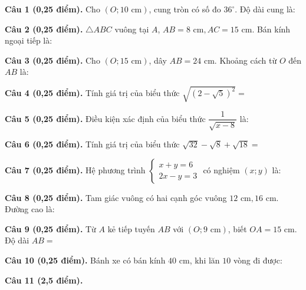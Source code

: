 \documentclass[12pt,a4paper]{article}
\begin{document}
\vspace{1.2mm}
\noindent\textbf{Câu 1 (0,25 điểm).} Cho $(O; 10\text{ cm})$, cung tròn có số đo $36^\circ$. Độ dài cung là: \par\vspace{0.8mm}
\noindent\textbf{Câu 2 (0,25 điểm).} $\triangle ABC$ vuông tại $A$, $AB = 8\text{ cm}, AC = 15\text{ cm}$. Bán kính ngoại tiếp là: \par\vspace{0.8mm}
\noindent\textbf{Câu 3 (0,25 điểm).} Cho $(O; 15\text{ cm})$, dây $AB = 24\text{ cm}$. Khoảng cách từ $O$ đến $AB$ là: \par\vspace{0.8mm}
\noindent\textbf{Câu 4 (0,25 điểm).} Tính giá trị của biểu thức $\sqrt{(2 - \sqrt{5})^2} = $ \par\vspace{0.8mm}
\noindent\textbf{Câu 5 (0,25 điểm).} Điều kiện xác định của biểu thức $\dfrac{1}{\sqrt{x - 8}}$ là: \par\vspace{0.8mm}
\noindent\textbf{Câu 6 (0,25 điểm).} Tính giá trị của biểu thức $\sqrt{32} - \sqrt{8} + \sqrt{18} = $ \par\vspace{0.8mm}
\noindent\textbf{Câu 7 (0,25 điểm).} Hệ phương trình $\begin{cases} x + y = 6 \\ 2x - y = 3 \end{cases}$ có nghiệm $(x; y)$ là: \par\vspace{0.8mm}
\noindent\textbf{Câu 8 (0,25 điểm).} Tam giác vuông có hai cạnh góc vuông $12\text{ cm}, 16\text{ cm}$. Đường cao là: \par\vspace{0.8mm}
\noindent\textbf{Câu 9 (0,25 điểm).} Từ $A$ kẻ tiếp tuyến $AB$ với $(O; 9\text{ cm})$, biết $OA = 15\text{ cm}$. Độ dài $AB = $ \par\vspace{0.8mm}
\noindent\textbf{Câu 10 (0,25 điểm).} Bánh xe có bán kính $40\text{ cm}$, khi lăn $10$ vòng đi được: \par\vspace{0.8mm}
\vspace{0.6mm}
\noindent\textbf{Câu 11 (2,5 điểm).}
\vspace{0.6mm}
\end{document}

